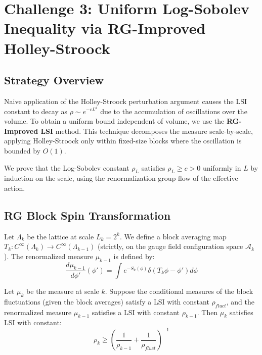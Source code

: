 \section{Challenge 3: Uniform Log-Sobolev Inequality via RG-Improved Holley-Stroock}
\label{sec:challenge3-lsi}
%

\subsection{Strategy Overview}

\begin{remark}
Naive application of the Holley-Stroock perturbation argument causes the LSI constant to decay as $\rho \sim e^{-cL^d}$ due to the accumulation of oscillations over the volume. To obtain a uniform bound independent of volume, we use the \textbf{RG-Improved LSI} method. This technique decomposes the measure scale-by-scale, applying Holley-Stroock only within fixed-size blocks where the oscillation is bounded by $O(1)$.
\end{remark}

We prove that the Log-Sobolev constant $\rho_L$ satisfies $\rho_L \geq c > 0$ uniformly in $L$ by induction on the scale, using the renormalization group flow of the effective action.

\subsection{RG Block Spin Transformation}

\begin{definition}
Let $\Lambda_k$ be the lattice at scale $L_k = 2^k$. We define a block averaging map $T_k: C^\infty(\Lambda_k) \to C^\infty(\Lambda_{k-1})$ (strictly, on the gauge field configuration space $\mathcal{A}_k$).
The renormalized measure $\mu_{k-1}$ is defined by:
\[
\frac{d\mu_{k-1}}{d\phi'} (\phi') = \int e^{-S_k(\phi)} \delta(T_k \phi - \phi') d\phi
\]
\end{definition}

\begin{theorem}
\label{thm:lsi-induction}
Let $\mu_k$ be the measure at scale $k$. Suppose the conditional measures of the block fluctuations (given the block averages) satisfy a LSI with constant $\rho_{fluct}$, and the renormalized measure $\mu_{k-1}$ satisfies a LSI with constant $\rho_{k-1}$. Then $\mu_k$ satisfies LSI with constant:
\[
\rho_k \geq \left( \frac{1}{\rho_{k-1}} + \frac{1}{\rho_{fluct}} \right)^{-1}
\]
\end{theorem}

